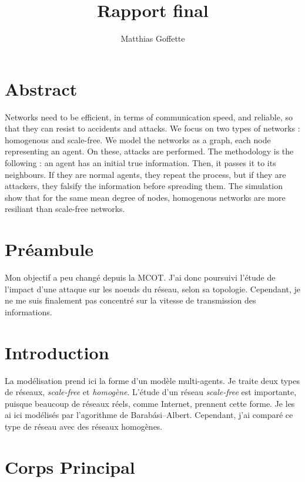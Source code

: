 \documentclass[11pt,a4paper]{article}
\title{Rapport final}
\author{Matthias Goffette}
\begin{document}
\maketitle

\section{Abstract} %

	Networks need to be efficient, in terms of communication speed, and reliable, so that they can resist to accidents and attacks. We focus on two types of networks : homogenous and scale-free. We model the networks as a graph, each node representing an agent. On these, attacks are performed. The methodology is the following : an agent has an initial true information. Then, it passes it to its neighbours. If they are normal agents, they repeat the process, but if they are attackers, they falsify the information before spreading them. The simulation show that for the same mean degree of nodes, homogenous networks are more resiliant than scale-free networks.



\section{Préambule} %

	Mon objectif a peu changé depuis la MCOT. J'ai donc poursuivi l'étude de l'impact d'une attaque sur les noeuds du réseau, selon sa topologie. Cependant, je ne me suis finalement pas concentré sur la vitesse de transmission des informations.

\section{Introduction} %
	
La modélisation prend ici la forme d'un modèle multi-agents. Je traite deux types de réseaux, \emph{scale-free} et \emph{homogène}. %
L'étude d'un réseau \emph{scale-free} est importante, puisque beaucoup de réseaux réels, comme Internet, prennent cette forme. Je les ai ici modélisés par l'agorithme de Barabási–Albert. Cependant, j'ai comparé ce type de réseau avec des réseaux homogènes.

\section{Corps Principal} %
\end{document}
